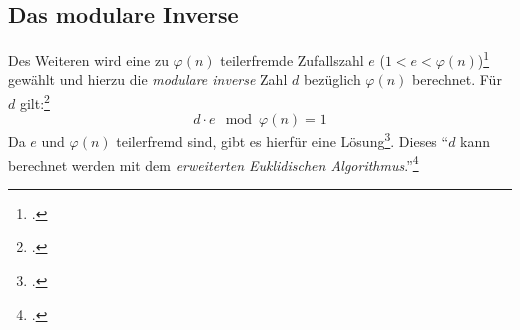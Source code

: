 \documentclass{scrarticle}
\begin{document}
        \subsection{Das modulare Inverse}
            Des Weiteren wird eine zu $\varphi(n)$ teilerfremde Zufallszahl $e$ ($1<e<\varphi(n)$)\footcite[71]{watjen2008} gewählt und hierzu die \emph{modulare inverse} Zahl $d$ bezüglich $\varphi(n)$ berechnet. Für $d$ gilt:\footcite[vgl.][279]{dankmeier2006}
            \begin{equation}
                d\cdot e\mod{\varphi(n)} = 1 \label{eq:modinv}
            \end{equation}
            Da $e$ und $\varphi(n)$ teilerfremd sind, gibt es hierfür eine Lösung\footcite[vgl.][77, 164]{ertel2003}. Dieses
            \enquote{$d$ kann berechnet werden mit dem \emph{erweiterten Euklidischen Algorithmus}.}\footcite[77]{ertel2003}
\end{document}
